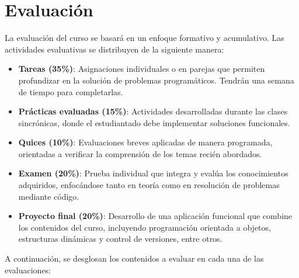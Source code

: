 \section{Evaluación}

La evaluación del curso se basará en un enfoque formativo y acumulativo.
Las actividades evaluativas se distribuyen de la siguiente manera:

\begin{itemize}
  \item \textbf{Tareas (35\%)}: Asignaciones individuales o en parejas que permiten profundizar en la solución de problemas programáticos. Tendrán una semana de tiempo para completarlas.

  \item \textbf{Prácticas evaluadas (15\%)}: Actividades desarrolladas durante las clases sincrónicas, donde el estudiantado debe implementar soluciones funcionales.

  \item \textbf{Quices (10\%)}: Evaluaciones breves aplicadas de manera programada, orientadas a verificar la comprensión de los temas recién abordados.

  \item \textbf{Examen (20\%)}: Prueba individual que integra y evalúa los conocimientos adquiridos, enfocándose tanto en teoría como en resolución de problemas mediante código.

  \item \textbf{Proyecto final (20\%)}: Desarrollo de una aplicación funcional que combine los contenidos del curso, incluyendo programación orientada a objetos, estructuras dinámicas y control de versiones, entre otros.

\end{itemize}

A continuación, se desglosan los contenidos a evaluar en cada una de las evaluaciones:

